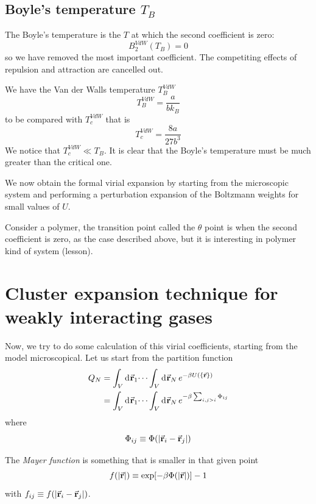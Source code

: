 \documentclass[../main/main.tex]{subfiles}
\begin{document}
\subsection{Boyle's temperature \( T_B \) }
The Boyle's temperature is the \( T \) at which the second coefficient is zero:
\begin{equation}
  B_2^{VdW} (T_B) = 0
\end{equation}
so we have removed the most important coefficient. The competiting effects of repulsion and attraction are cancelled out.

We have the Van der Walls temperature \( T_B^{VdW} \)
\begin{equation}
  T_B^{VdW} = \frac{a}{b k_B}
\end{equation}
to be compared with \( T_c^{VdW} \) that is
\begin{equation}
  T_c^{VdW} = \frac{8 a}{27 b^3}
\end{equation}
We notice that \( T_c^{VdW} \ll T_B \).  It is clear that the Boyle's temperature must be much greater than the critical one.

We now obtain the formal virial expansion by starting from the microscopic system and performing a perturbation expansion of the Boltzmann weights for small values of \( U \).

\begin{remark}
   Consider a polymer, the transition point called the \( \theta  \) point is when the second coefficient is zero, as the case described above, but it is interesting in polymer kind of system (lesson).
\end{remark}

\section{Cluster expansion technique for weakly interacting gases}
Now, we try to do some calculation of this virial coefficients, starting from the model microscopical.
Let us start from the partition function
\begin{equation}
\begin{split}
  Q_N &= \int_{V}^{} \dd[]{\va{r}_1} \dots \int_{V}^{} \dd[]{\va{r}_N}  e^{-\beta U (\{ \va{r} \}  ) } \\
  & = \int_{V}^{} \dd[]{\va{r}_1} \dots \int_{V}^{} \dd[]{\va{r}_N}  e^{-\beta \sum_{i,j > i}^{} \Phi _{ij} }
\end{split}
\end{equation}
where
\begin{equation}
  \Phi _{ij} \equiv \Phi (\abs{\va{r}_i - \va{r}_j} )
\end{equation}
\begin{definition}
  The \emph{Mayer function}  is something that is smaller in that given point
  \begin{equation}
    f (\abs{\va{r}} ) \equiv \exp [ - \beta \Phi ( \abs{\va{r}} )] -1
  \end{equation}
  with \( f_{ij} \equiv f (\abs{\va{r}_i - \va{r}_j} ) \).
\end{definition}
\end{document}
